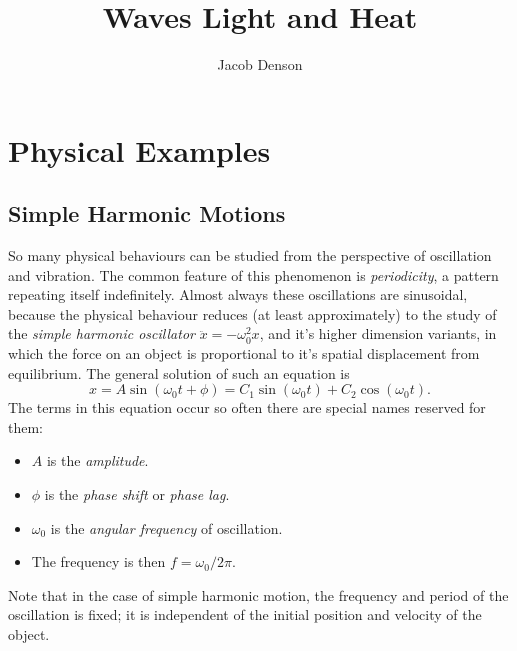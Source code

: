 

\title{Waves Light and Heat}
\author{Jacob Denson}



\maketitle
\tableofcontents
{}

\chapter{Physical Examples}

\section{Simple Harmonic Motions}

So many physical behaviours can be studied from the perspective of oscillation and vibration. The common feature of this phenomenon is \emph{periodicity}, a pattern repeating itself indefinitely. Almost always these oscillations are sinusoidal, because the physical behaviour reduces (at least approximately) to the study of the \emph{simple harmonic oscillator} $\ddot{x} = - \omega_0^2 x$, and it's higher dimension variants, in which the force on an object is proportional to it's spatial displacement from equilibrium. The general solution of such an equation is
%
\[ x = A \sin(\omega_0 t + \phi) = C_1 \sin(\omega_0 t) + C_2 \cos(\omega_0 t). \]
%
The terms in this equation occur so often there are special names reserved for them:
%
\begin{itemize}
    \item $A$ is the \emph{amplitude}.
    \item $\phi$ is the \emph{phase shift} or \emph{phase lag}.
    \item $\omega_0$ is the \emph{angular frequency} of oscillation.
    \item The frequency is then $f = \omega_0 / 2\pi$.
\end{itemize}
%
Note that in the case of simple harmonic motion, the frequency and period of the oscillation is fixed; it is independent of the initial position and velocity of the object.

